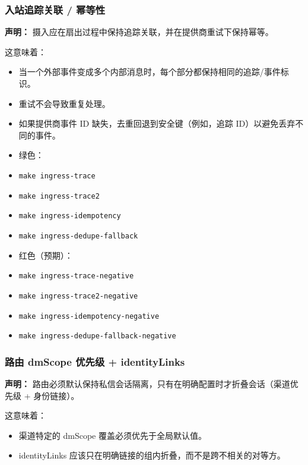 \subsubsection{入站追踪关联 / 幂等性}


\textbf{声明：} 摄入应在扇出过程中保持追踪关联，并在提供商重试下保持幂等。

这意味着：

\begin{itemize}
  \item 当一个外部事件变成多个内部消息时，每个部分都保持相同的追踪/事件标识。
  \item 重试不会导致重复处理。
  \item 如果提供商事件 ID 缺失，去重回退到安全键（例如，追踪 ID）以避免丢弃不同的事件。
\end{itemize}


\begin{itemize}
  \item 绿色：
  \item \texttt{make ingress-trace}
  \item \texttt{make ingress-trace2}
  \item \texttt{make ingress-idempotency}
  \item \texttt{make ingress-dedupe-fallback}
  \item 红色（预期）：
  \item \texttt{make ingress-trace-negative}
  \item \texttt{make ingress-trace2-negative}
  \item \texttt{make ingress-idempotency-negative}
  \item \texttt{make ingress-dedupe-fallback-negative}
\end{itemize}


\subsubsection{路由 dmScope 优先级 + identityLinks}


\textbf{声明：} 路由必须默认保持私信会话隔离，只有在明确配置时才折叠会话（渠道优先级 + 身份链接）。

这意味着：

\begin{itemize}
  \item 渠道特定的 dmScope 覆盖必须优先于全局默认值。
  \item identityLinks 应该只在明确链接的组内折叠，而不是跨不相关的对等方。
\end{itemize}


